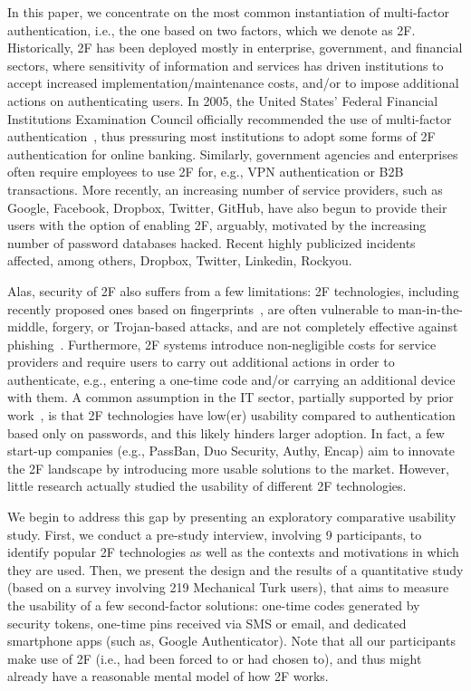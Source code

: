 \documentclass[conference]{IEEEtran}
\begin{document}
In this paper, we concentrate on the most common instantiation of multi-factor authentication, i.e., the one based on two factors, which we denote as 2F.
Historically, 2F has been deployed mostly in enterprise, government, and financial sectors, where sensitivity of information and services has driven institutions to accept increased implementation/maintenance costs, and/or to impose additional actions on authenticating users. In 2005, the United States' Federal Financial Institutions Examination Council officially recommended the use of multi-factor authentication~\cite{council2005}, thus pressuring most institutions to adopt some forms of 2F authentication for online banking. Similarly, government agencies and enterprises often require employees to use 2F for, e.g., VPN authentication or B2B transactions. More recently, an increasing number of service providers, such as Google, Facebook, Dropbox, Twitter, GitHub, have also begun to provide their users with the option of enabling 2F, arguably, motivated by the increasing number of password databases hacked. Recent highly publicized incidents affected, among others, Dropbox, Twitter, Linkedin, Rockyou.


Alas, security of 2F also suffers from a few limitations: 2F technologies, including recently proposed ones based on fingerprints~\cite{iphone}, are often vulnerable to man-in-the-middle, forgery, or Trojan-based attacks, and are not completely effective against phishing~\cite{schneier2005two}. Furthermore, 2F systems introduce non-negligible costs for service providers and require users to carry out additional actions in order to authenticate, e.g., entering a one-time code and/or carrying an additional device with them. A common assumption in the IT sector, partially supported by prior work~\cite{bauer2007lessons,bonneau2012quest,braz2006security,gunson2011user,sabzevar2008universal,strouble2009productivity}, is that 2F technologies have low(er) usability compared to authentication based only on passwords, and this likely hinders larger adoption. 
In fact, a few start-up companies (e.g., PassBan, Duo Security, Authy, Encap) aim to innovate the 2F landscape by introducing more usable solutions to the market.
However, little research actually studied the usability of different 2F technologies. 

We begin to address this gap by presenting an exploratory comparative usability study. First, we conduct a pre-study interview, involving 9 participants, to identify popular 2F technologies as well as the contexts and motivations in which they are used. Then, we present the design and the results of a quantitative study (based on a survey involving 219 Mechanical Turk users), that aims to
measure the usability of a few second-factor solutions: one-time codes generated by security tokens, one-time pins received via SMS or email, and dedicated smartphone apps (such as, Google Authenticator).
Note that all our participants make use of 2F (i.e., had been forced to or had chosen to), and thus might already have a reasonable mental model of how 2F works.  
\end{document}
